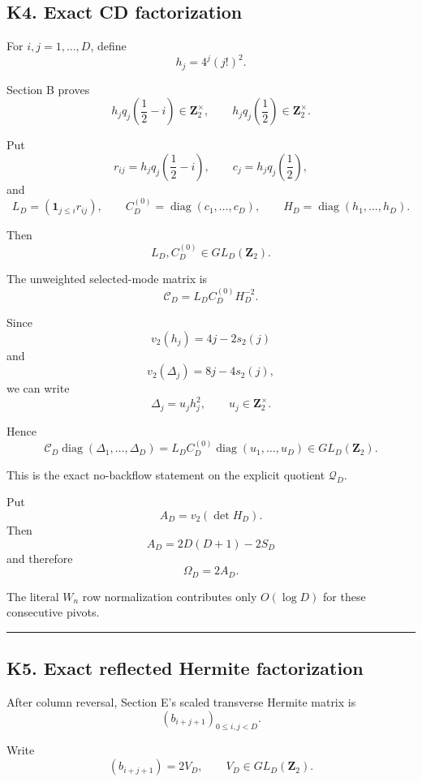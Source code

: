 \documentclass[
  10pt,
  letterpaper,
]{article}
\theoremstyle{definition}
\theoremstyle{remark}
\begin{document}
\subsection{K4. Exact CD
factorization}\label{k4.-exact-cd-factorization}

For \(i,j=1,\ldots,D\), define \[
h_j=4^j(j!)^2.
\tag{K4.1}
\]

Section B proves \[
h_jq_j\!\left(\frac12-i\right)\in\mathbf Z_2^\times,
\qquad
h_jq_j\!\left(\frac12\right)\in\mathbf Z_2^\times.
\tag{K4.2}
\]

Put \[
r_{ij}=h_jq_j\!\left(\frac12-i\right),
\qquad
c_j=h_jq_j\!\left(\frac12\right),
\] and \[
L_D=(\mathbf1_{j\le i}r_{ij}),
\qquad
C_D^{(0)}=\operatorname{diag}(c_1,\ldots,c_D),
\qquad
H_D=\operatorname{diag}(h_1,\ldots,h_D).
\tag{K4.3}
\]

Then \[
L_D,C_D^{(0)}\in GL_D(\mathbf Z_2).
\tag{K4.4}
\]

The unweighted selected-mode matrix is \[
\boxed{
\mathcal C_D
=
L_DC_D^{(0)}H_D^{-2}.
}
\tag{K4.5}
\]

Since \[
v_2(h_j)=4j-2s_2(j)
\] and \[
v_2(\Delta_j)=8j-4s_2(j),
\] we can write \[
\Delta_j=u_jh_j^2,
\qquad
u_j\in\mathbf Z_2^\times.
\tag{K4.6}
\]

Hence \[
\boxed{
\mathcal C_D
\operatorname{diag}(\Delta_1,\ldots,\Delta_D)
=
L_DC_D^{(0)}
\operatorname{diag}(u_1,\ldots,u_D)
\in GL_D(\mathbf Z_2).
}
\tag{K4.7}
\]

This is the exact no-backflow statement on the explicit quotient
\(\mathcal Q_D\).

Put \[
A_D=v_2(\det H_D).
\] Then \[
A_D
=
2D(D+1)-2S_D
\tag{K4.8}
\] and therefore \[
\boxed{
\Omega_D=2A_D.
}
\tag{K4.9}
\]

The literal \(W_n\) row normalization contributes only \(O(\log D)\) for
these consecutive pivots.

\begin{center}\rule{0.5\linewidth}{0.5pt}\end{center}

\subsection{K5. Exact reflected Hermite
factorization}\label{k5.-exact-reflected-hermite-factorization}

After column reversal, Section E's scaled transverse Hermite matrix is
\[
(b_{i+j+1})_{0\le i,j<D}.
\]

Write \[
(b_{i+j+1})=2V_D,
\qquad
V_D\in GL_D(\mathbf Z_2).
\tag{K5.1}
\]
\end{document}
